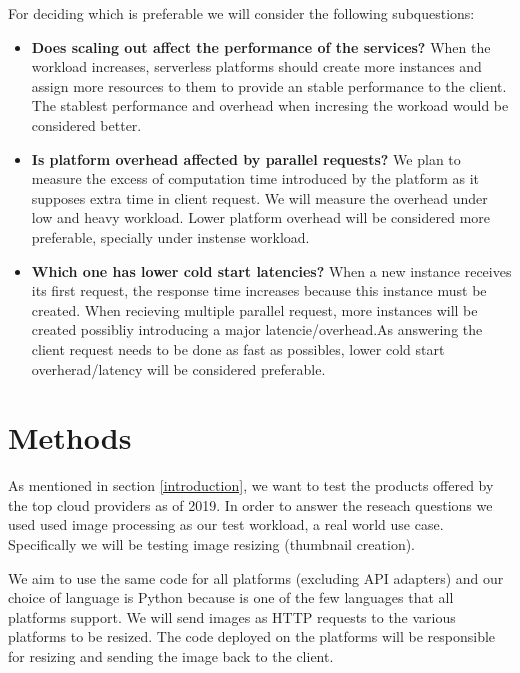 \documentclass[11pt]{article}
\begin{document}
For deciding which is preferable we will consider the following subquestions:

\begin{itemize}

\item \textbf{Does scaling out affect the performance of the services?} When the workload increases, serverless platforms should create more instances and assign more resources to them to provide an stable performance to the client. The stablest performance and overhead when incresing the workoad would be considered better.

\item \textbf{Is platform overhead affected by parallel requests?} We plan to measure the excess of computation time introduced by the platform as it supposes extra time in client request. We will measure the overhead under low and heavy workload. Lower platform overhead will be considered more preferable, specially under instense workload.

\item \textbf{Which one has lower cold start latencies?} When a new instance receives its first request, the response time increases because this instance must be created. When recieving multiple parallel request, more instances will be created possibliy introducing a major latencie/overhead.As answering the client request needs to be done as fast as possibles, lower cold start overherad/latency will be considered preferable. 
\end{itemize}





\section{Methods}
\label{methods}
As mentioned in section \ref{introduction}, we want to test the products offered by the top cloud providers as of 2019. In order to answer the reseach questions we used used image processing as our test workload, a real world \cite{ii} use case. Specifically we will be testing image resizing (thumbnail creation).

 We aim to use the same code for all platforms (excluding API adapters) and our choice of language is Python because is one of the few languages that all platforms support. We will send images as HTTP requests to the various platforms to be resized. The code deployed on the platforms will be responsible for resizing and sending the image back to the client. 
\end{document}
